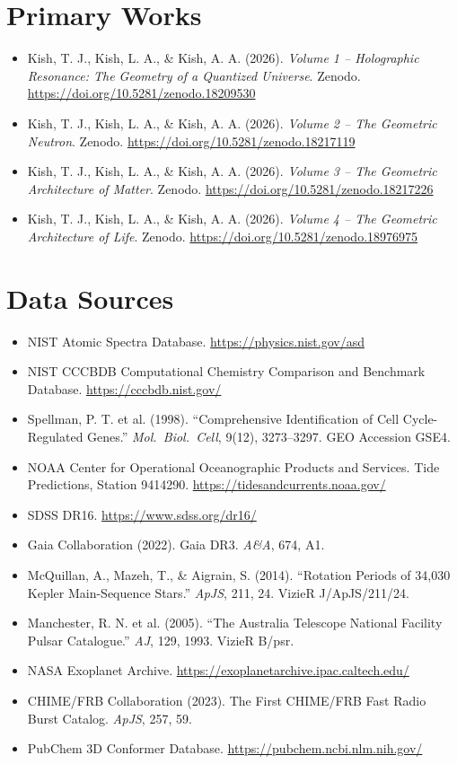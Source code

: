 \documentclass[11pt, letterpaper, openany]{book}
\begin{document}
\section*{Primary Works}
\begin{itemize}
    \item Kish, T. J., Kish, L. A., \& Kish, A. A. (2026). \textit{Volume 1 -- Holographic Resonance: The Geometry of a Quantized Universe}. Zenodo. \url{https://doi.org/10.5281/zenodo.18209530}
    \item Kish, T. J., Kish, L. A., \& Kish, A. A. (2026). \textit{Volume 2 -- The Geometric Neutron}. Zenodo. \url{https://doi.org/10.5281/zenodo.18217119}
    \item Kish, T. J., Kish, L. A., \& Kish, A. A. (2026). \textit{Volume 3 -- The Geometric Architecture of Matter}. Zenodo. \url{https://doi.org/10.5281/zenodo.18217226}
    \item Kish, T. J., Kish, L. A., \& Kish, A. A. (2026). \textit{Volume 4 -- The Geometric Architecture of Life}. Zenodo. \url{https://doi.org/10.5281/zenodo.18976975}
\end{itemize}

\section*{Data Sources}

\begin{itemize}
    \item NIST Atomic Spectra Database. \url{https://physics.nist.gov/asd}
    \item NIST CCCBDB Computational Chemistry Comparison and Benchmark Database. \url{https://cccbdb.nist.gov/}
    \item Spellman, P. T. et al. (1998). ``Comprehensive Identification of Cell Cycle-Regulated Genes.'' \textit{Mol.\ Biol.\ Cell}, 9(12), 3273--3297. GEO Accession GSE4.
    \item NOAA Center for Operational Oceanographic Products and Services. Tide Predictions, Station 9414290. \url{https://tidesandcurrents.noaa.gov/}
    \item SDSS DR16. \url{https://www.sdss.org/dr16/}
    \item Gaia Collaboration (2022). Gaia DR3. \textit{A\&A}, 674, A1.
    \item McQuillan, A., Mazeh, T., \& Aigrain, S. (2014). ``Rotation Periods of 34,030 Kepler Main-Sequence Stars.'' \textit{ApJS}, 211, 24. VizieR J/ApJS/211/24.
    \item Manchester, R. N. et al. (2005). ``The Australia Telescope National Facility Pulsar Catalogue.'' \textit{AJ}, 129, 1993. VizieR B/psr.
    \item NASA Exoplanet Archive. \url{https://exoplanetarchive.ipac.caltech.edu/}
    \item CHIME/FRB Collaboration (2023). The First CHIME/FRB Fast Radio Burst Catalog. \textit{ApJS}, 257, 59.
    \item PubChem 3D Conformer Database. \url{https://pubchem.ncbi.nlm.nih.gov/}
\end{itemize}
\end{document}
